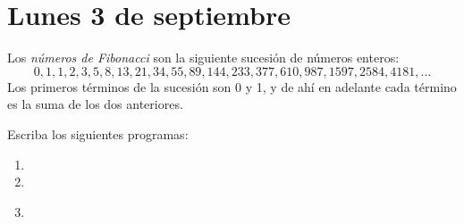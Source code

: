 \documentclass[12pt,spanish]{article}
\begin{document}
  \thispagestyle{empty}
  \section*{Lunes 3 de septiembre}

  Los \emph {números de Fibonacci} son
  la siguiente sucesión de números enteros:
  \[
      0,   1,    1,    2,    3,
      5,   8,   13,   21,   34,
     55,  89,  144,  233,  377,
    610, 987, 1597, 2584, 4181, \ldots
  \]
  Los primeros términos de la sucesión son 0 y 1,
  y de ahí en adelante cada término es la suma de los dos anteriores.

  Escriba los siguientes programas:
  \begin{enumerate}[leftmargin=0pt]

    \item
      \begin{minipage}[t]{0.7\textwidth}
        \small
        
      \end{minipage}

    \item
      \begin{minipage}[t]{0.7\textwidth}
        \small
        
      \end{minipage}

    \item
      \begin{minipage}[t]{0.7\textwidth}
        \small
        
      \end{minipage} \\
      \begin{minipage}[t]{0.7\textwidth}
        \small
        
      \end{minipage}


  \end{enumerate}
\end{document}
